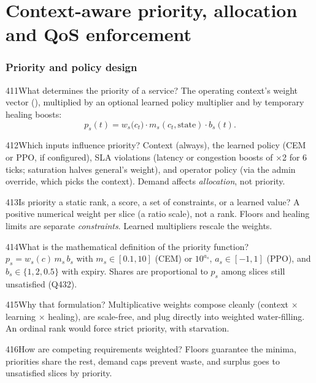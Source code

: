 \part{Context-aware priority, allocation and QoS enforcement}

\section{Priority and policy design}

\begin{qa}{411}{What determines the priority of a service?}
The operating context's weight vector (), multiplied by an optional learned policy multiplier and
by temporary healing boosts:
\[
p_s(t)=w_s\big(c_t\big)\cdot m_s(c_t,\text{state})\cdot b_s(t).
\]
\end{qa}

\begin{qa}{412}{Which inputs influence priority?}
Context (always), the learned policy (CEM or PPO, if configured), SLA violations (latency or congestion boosts of
$\times$2 for 6 ticks; saturation halves general's weight), and operator policy (via the admin override, which picks the
context). Demand affects \emph{allocation}, not priority.
\end{qa}

\begin{qa}{413}{Is priority a static rank, a score, a set of constraints, or a learned value?}
A positive numerical weight per slice (a ratio scale), not a rank. Floors and healing limits are separate
\emph{constraints}. Learned multipliers rescale the weights.
\end{qa}

\begin{qa}{414}{What is the mathematical definition of the priority function?}
$p_s=w_s(c)\,m_s\,b_s$ with $m_s\in[0.1,10]$ (CEM) or $10^{a_s}$, $a_s\in[-1,1]$ (PPO), and $b_s\in\{1,2,0.5\}$ with
expiry. Shares are proportional to $p_s$ among slices still unsatisfied (Q432).
\end{qa}

\begin{qa}{415}{Why that formulation?}
Multiplicative weights compose cleanly (context $\times$ learning $\times$ healing), are scale-free, and plug directly
into weighted water-filling. An ordinal rank would force strict priority, with starvation.
\end{qa}

\begin{qa}{416}{How are competing requirements weighted?}
Floors guarantee the minima, priorities share the rest, demand caps prevent waste, and surplus goes to unsatisfied
slices by priority.
\end{qa}


